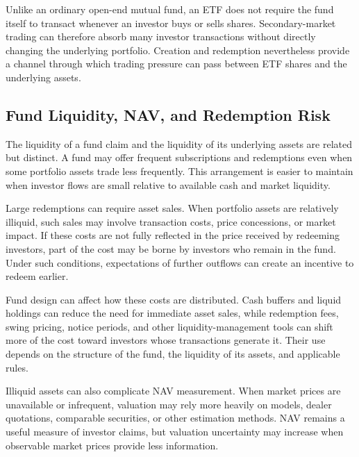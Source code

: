 Unlike an ordinary open-end mutual fund, an ETF does not require the fund itself to transact whenever an investor buys or sells shares. Secondary-market trading can therefore absorb many investor transactions without directly changing the underlying portfolio. Creation and redemption nevertheless provide a channel through which trading pressure can pass between ETF shares and the underlying assets.

\subsection{Fund Liquidity, NAV, and Redemption Risk}

The liquidity of a fund claim and the liquidity of its underlying assets are related but distinct. A fund may offer frequent subscriptions and redemptions even when some portfolio assets trade less frequently. This arrangement is easier to maintain when investor flows are small relative to available cash and market liquidity.

Large redemptions can require asset sales. When portfolio assets are relatively illiquid, such sales may involve transaction costs, price concessions, or market impact. If these costs are not fully reflected in the price received by redeeming investors, part of the cost may be borne by investors who remain in the fund. Under such conditions, expectations of further outflows can create an incentive to redeem earlier.

Fund design can affect how these costs are distributed. Cash buffers and liquid holdings can reduce the need for immediate asset sales, while redemption fees, swing pricing, notice periods, and other liquidity-management tools can shift more of the cost toward investors whose transactions generate it. Their use depends on the structure of the fund, the liquidity of its assets, and applicable rules.

Illiquid assets can also complicate NAV measurement. When market prices are unavailable or infrequent, valuation may rely more heavily on models, dealer quotations, comparable securities, or other estimation methods. NAV remains a useful measure of investor claims, but valuation uncertainty may increase when observable market prices provide less information.

